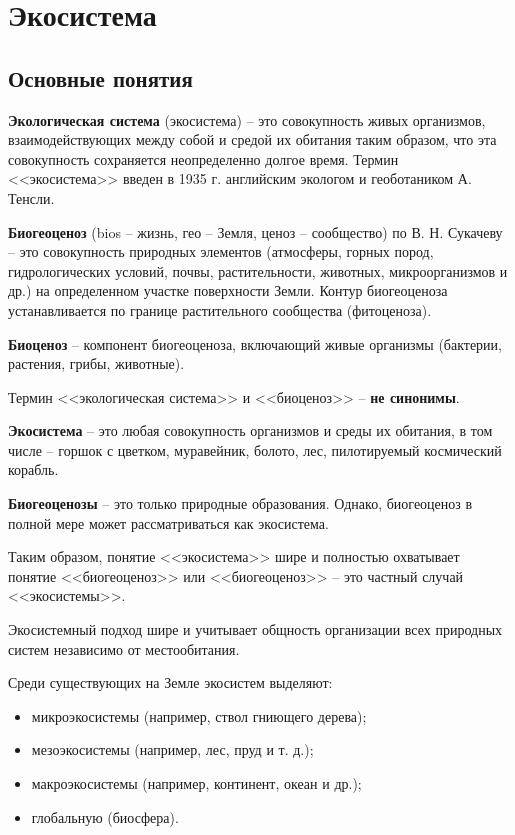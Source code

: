 \documentclass[a5paper, 11pt]{extarticle}
\theoremstyle{definition}
\theoremstyle{definition}
\theoremstyle{definition}
\numberwithin{figure}{section}
\begin{document}
\section{Экосистема}

\subsection{Основные понятия}

\textbf{Экологическая система} (экосистема) -- это совокупность живых организмов, взаимодействующих между собой и средой их обитания таким образом, что эта совокупность сохраняется неопределенно долгое время. Термин <<экосистема>> введен в 1935 г. английским экологом и геоботаником А. Тенсли.

\textbf{Биогеоценоз} (bios -- жизнь, гео -- Земля, ценоз -- сообщество) по В. Н. Сукачеву -- это совокупность природных элементов (атмосферы, горных пород, гидрологических условий, почвы, растительности, животных, микроорганизмов и др.) на определенном участке поверхности Земли. Контур биогеоценоза устанавливается по границе растительного сообщества (фитоценоза).

\textbf{Биоценоз} -- компонент биогеоценоза, включающий живые организмы (бактерии, растения, грибы, животные).

Термин <<экологическая система>> и <<биоценоз>> -- \textbf{не синонимы}.

\textbf{Экосистема} -- это любая совокупность организмов и среды их обитания, в том числе -- горшок с цветком, муравейник, болото, лес, пилотируемый космический корабль.

\textbf{Биогеоценозы} -- это только природные образования. Однако, биогеоценоз в полной мере может рассматриваться как экосистема.

Таким образом, понятие <<экосистема>> шире и полностью охватывает понятие <<биогеоценоз>> или <<биогеоценоз>> -- это частный случай <<экосистемы>>.

Экосистемный подход шире и учитывает общность организации всех природных систем независимо от местообитания.

Среди существующих на Земле экосистем выделяют:
\begin{itemize}
    \item микроэкосистемы (например, ствол гниющего дерева);
    \item мезоэкосистемы (например, лес, пруд и т. д.);
    \item макроэкосистемы (например, континент, океан и др.);
    \item глобальную (биосфера).
\end{itemize}
\end{document}
